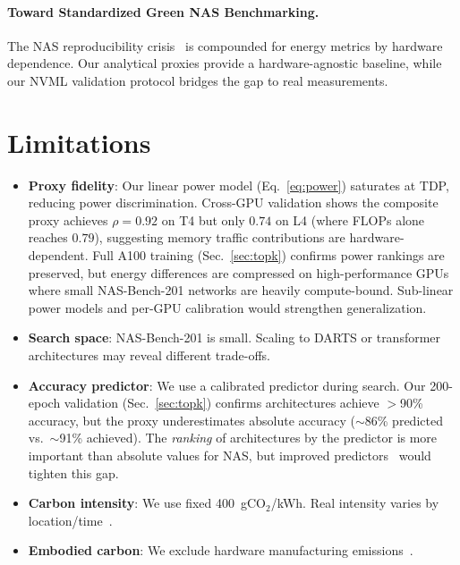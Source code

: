 \documentclass[10pt,twocolumn,letterpaper]{article}
\begin{document}
\paragraph{Toward Standardized Green NAS Benchmarking.}
The NAS reproducibility crisis~\cite{li2019random,yang2020nas,lindauer2020best} is compounded for energy metrics by hardware dependence. Our analytical proxies provide a hardware-agnostic baseline, while our NVML validation protocol bridges the gap to real measurements.

\section{Limitations}
\label{sec:limitations}

\begin{itemize}[leftmargin=*,nosep]
\item \textbf{Proxy fidelity}: Our linear power model (Eq.~\ref{eq:power}) saturates at TDP, reducing power discrimination. Cross-GPU validation shows the composite proxy achieves $\rho = 0.92$ on T4 but only $0.74$ on L4 (where FLOPs alone reaches $0.79$), suggesting memory traffic contributions are hardware-dependent. Full A100 training (Sec.~\ref{sec:topk}) confirms power rankings are preserved, but energy differences are compressed on high-performance GPUs where small NAS-Bench-201 networks are heavily compute-bound. Sub-linear power models and per-GPU calibration would strengthen generalization.
\item \textbf{Search space}: NAS-Bench-201 is small. Scaling to DARTS or transformer architectures may reveal different trade-offs.
\item \textbf{Accuracy predictor}: We use a calibrated predictor during search. Our 200-epoch validation (Sec.~\ref{sec:topk}) confirms architectures achieve $>$90\% accuracy, but the proxy underestimates absolute accuracy ($\sim$86\% predicted vs.\ $\sim$91\% achieved). The \emph{ranking} of architectures by the predictor is more important than absolute values for NAS, but improved predictors~\cite{dong2020nasbench201} would tighten this gap.
\item \textbf{Carbon intensity}: We use fixed 400~gCO$_2$/kWh. Real intensity varies by location/time~\cite{dodge2022measuring}.
\item \textbf{Embodied carbon}: We exclude hardware manufacturing emissions~\cite{gupta2021chasing}.
\end{itemize}
\end{document}
